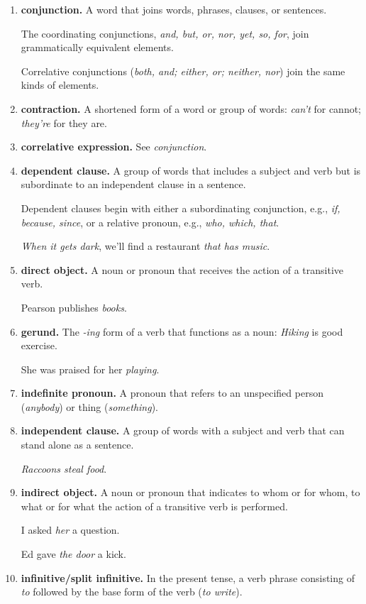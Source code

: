 \documentclass{book}
\numberwithin{equation}{section}
\begin{document}
\begin{enumerate}
    \textit{Hemingway and Fitzgerald} had little in common.
    \item \textbf{conjunction.} A word that joins words, phrases, clauses, or sentences.
    
    The coordinating conjunctions, \textit{and, but, or, nor, yet, so, for}, join grammatically equivalent elements.
    
    Correlative conjunctions (\textit{both, and; either, or; neither, nor}) join the same kinds of elements.
    \item \textbf{contraction.} A shortened form of a word or group of words: \textit{can't} for cannot; \textit{they're} for they are.
    \item \textbf{correlative expression.} See \textit{conjunction}.
    \item \textbf{dependent clause.} A group of words that includes a subject and verb but is subordinate to an independent clause in a sentence.
    
    Dependent clauses begin with either a subordinating conjunction, e.g., \textit{if, because, since}, or a relative pronoun, e.g., \textit{who, which, that}.
    
    \textit{When it gets dark}, we'll find a restaurant \textit{that has music}.
    \item \textbf{direct object.} A noun or pronoun that receives the action of a transitive verb.
    
    Pearson publishes \textit{books}.
    \item \textbf{gerund.} The \textit{-ing} form of a verb that functions as a noun: \textit{Hiking} is good exercise.
    
    She was praised for her \textit{playing}.
    \item \textbf{indefinite pronoun.} A pronoun that refers to an unspecified person (\textit{anybody}) or thing (\textit{something}).
    \item \textbf{independent clause.} A group of words with a subject and verb that can stand alone as a sentence.
    
    \textit{Raccoons steal food}.
    \item \textbf{indirect object.} A noun or pronoun that indicates to whom or for whom, to what or for what the action of a transitive verb is performed.
    
    I asked \textit{her} a question.
    
    Ed gave \textit{the door} a kick.
    \item \textbf{infinitive/split infinitive.} In the present tense, a verb phrase consisting of \textit{to} followed by the base form of the verb (\textit{to write}).
    

\end{enumerate}
\end{document}
